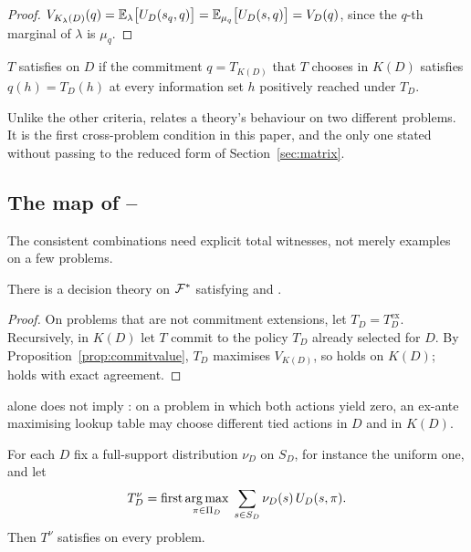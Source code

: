 \begin{proof}
$V_{K_\lambda(D)}(q)=\mathbb{E}_\lambda\bigl[U_D(s_q,q)\bigr]=\mathbb{E}_{\mu_q}\bigl[U_D(s,q)\bigr]=V_D(q)$, since the
$q$-th marginal of $\lambda$ is $\mu_q$.
\end{proof}

\begin{definition}
$T$ satisfies  on $D$ if the commitment $q=T_{K(D)}$ that $T$ chooses in $K(D)$ satisfies
$q(h)=T_D(h)$ at every information set $h$ positively reached under $T_D$.
\end{definition}

Unlike the other criteria,  relates a theory's behaviour on two different problems. It is
the first cross-problem condition in this paper, and the only one stated without passing to the
reduced form of Section~\ref{sec:matrix}.

\subsection{The map of \texorpdfstring{--}{C1-C5}}

The consistent combinations need explicit total witnesses, not merely examples on a few problems.

\begin{proposition}\label{prop:coherent}
There is a decision theory on $\mathcal{F}^*$ satisfying  and .
\end{proposition}

\begin{proof}
On problems that are not commitment extensions, let $T_D=T^{\mathrm{ex}}_D$. Recursively, in $K(D)$
let $T$ commit to the policy $T_D$ already selected for $D$. By Proposition~\ref{prop:commitvalue},
$T_D$ maximises $V_{K(D)}$, so  holds on $K(D)$;  holds with exact agreement.
\end{proof}

 alone does not imply : on a problem in which both actions yield zero, an ex-ante
maximising lookup table may choose different tied actions in $D$ and in $K(D)$.

\begin{proposition}\label{prop:nu}
For each $D$ fix a full-support distribution $\nu_D$ on $S_D$, for instance the uniform one, and let
\[
  T^{\nu}_D=\operatorname{first}\operatorname*{arg\,max}_{\pi\in\Pi_D}\;\sum_{s\in S_D}\nu_D(s)\,U_D(s,\pi).
\]
Then $T^{\nu}$ satisfies  on every problem.
\end{proposition}

